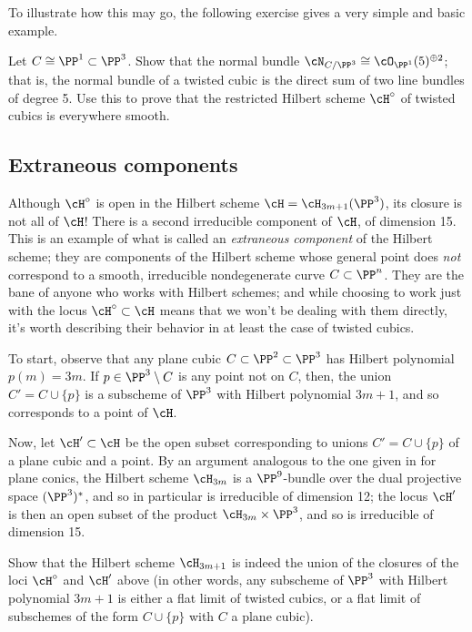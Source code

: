 To illustrate how this may go, the following exercise gives a very simple and basic example.

\begin{exercise}\label{twisted cubic normal bundle}
Let $C \cong \PP^1 \subset \PP^3$. Show that the normal bundle $\cN_{C/\PP^3} \cong \cO_{\PP^1}(5)^{\oplus 2}$; that is, the normal bundle of a twisted cubic is the direct sum of two line bundles of degree 5. Use this to prove that the restricted Hilbert scheme $\cH^\circ$ of twisted cubics is everywhere smooth.
\end{exercise}

\subsection{Extraneous components}


Although $\cH^\circ$ is open in the Hilbert scheme $\cH = \cH_{3m+1}(\PP^3)$, its closure is not all of $\cH$! There is a second irreducible component of $\cH$, of dimension 15. This is an example of what is called an \emph{extraneous component} of the Hilbert scheme; they are components of the Hilbert scheme whose general point does \emph{not} correspond to a smooth, irreducible nondegenerate curve $C \subset \PP^n$. They are the bane of anyone who works with Hilbert schemes; and while choosing to work just with the locus $\cH^\circ \subset \cH$ means that we won't be dealing with them directly, it's worth describing their behavior in at least the case of twisted cubics.


To start, observe that any plane cubic $C \subset \PP^2 \subset \PP^3$ has Hilbert polynomial $p(m) = 3m$. If $p \in \PP^3 \setminus C$ is any point not on $C$, then, the union $C' = C \cup \{p\}$ is a subscheme of $\PP^3$ with Hilbert polynomial $3m+1$, and so corresponds to a point of $\cH$. 

Now, let $\cH' \subset \cH$ be the open subset corresponding to unions $C' = C \cup \{p\}$ of a plane cubic and a point. By an argument analogous to the one given in \cite{3264} for plane conics, the Hilbert scheme $\cH_{3m}$ is a $\PP^9$-bundle over the dual projective space $(\PP^3)^*$, and so in particular is irreducible of dimension 12; the locus $\cH'$ is then an open subset of the product $\cH_{3m} \times \PP^3$, and so is irreducible of dimension 15. 

\begin{exercise} 
Show that the Hilbert scheme $\cH_{3m+1}$ is indeed the union of the closures of the loci $\cH^\circ$ and $\cH'$ above (in other words, any subscheme of $\PP^3$ with Hilbert polynomial $3m+1$ is either a flat limit of twisted cubics, or a flat limit of subschemes of the form $C \cup \{p\}$ with $C$ a plane cubic).
\end{exercise}

